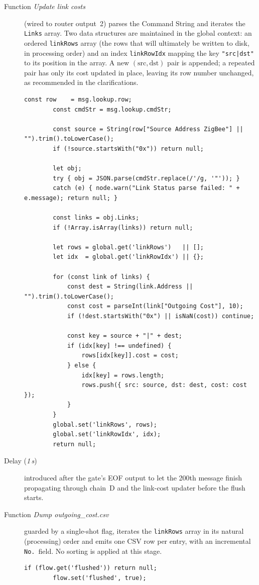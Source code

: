 \begin{description}
    \item[Function \emph{Update link costs}] (wired to router output~2)
        parses the Command String and iterates the \texttt{Links}
        array. Two data structures are maintained in the global
        context: an ordered \verb|linkRows| array (the rows that will
        ultimately be written to disk, in processing order) and an
        index \verb|linkRowIdx| mapping the key
        \texttt{"src|dst"} to its position in the array. A new
        $(\text{src},\text{dst})$ pair is appended; a repeated pair has
        only its cost updated in place, leaving its row number
        unchanged, as recommended in the clarifications.
        \begin{lstlisting}[]
        const row    = msg.lookup.row;
        const cmdStr = msg.lookup.cmdStr;
        
        const source = String(row["Source Address ZigBee"] || "").trim().toLowerCase();
        if (!source.startsWith("0x")) return null;
        
        let obj;
        try { obj = JSON.parse(cmdStr.replace(/'/g, '"')); }
        catch (e) { node.warn("Link Status parse failed: " + e.message); return null; }
        
        const links = obj.Links;
        if (!Array.isArray(links)) return null;
        
        let rows = global.get('linkRows')   || [];
        let idx  = global.get('linkRowIdx') || {};
        
        for (const link of links) {
            const dest = String(link.Address || "").trim().toLowerCase();
            const cost = parseInt(link["Outgoing Cost"], 10);
            if (!dest.startsWith("0x") || isNaN(cost)) continue;
        
            const key = source + "|" + dest;
            if (idx[key] !== undefined) {
                rows[idx[key]].cost = cost;
            } else {
                idx[key] = rows.length;
                rows.push({ src: source, dst: dest, cost: cost });
            }
        }
        global.set('linkRows', rows);
        global.set('linkRowIdx', idx);
        return null;
        \end{lstlisting}
    \item[Delay (\emph{1\,s})] introduced after the gate's EOF output
        to let the 200th message finish propagating through chain~D
        and the link-cost updater before the flush starts.
    \item[Function \emph{Dump outgoing\_cost.csv}] guarded by a
        single-shot flag, iterates the \verb|linkRows| array in its
        natural (processing) order and emits one CSV row per entry,
        with an incremental \texttt{No.}\ field. No sorting is applied
        at this stage.
        \begin{lstlisting}[]
        if (flow.get('flushed')) return null;
        flow.set('flushed', true);
        

\end{lstlisting}
\end{description}
